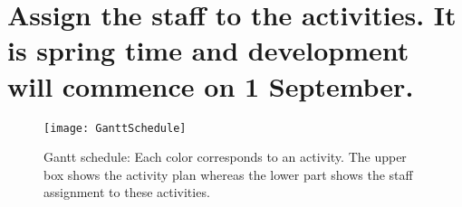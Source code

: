 \documentclass[Main]{subfiles}
\begin{document}
\section{Assign the staff to the activities. It is spring time and development will commence on 1 September.}
\begin{figure}[H]
\centering
\texttt{[image: GanttSchedule]}
\caption{Gantt schedule: Each color corresponds to an activity. The upper box shows the activity plan whereas the lower part shows the staff assignment to these activities.}
\label{fig:ganttSchedule}
\end{figure}
\end{document}
